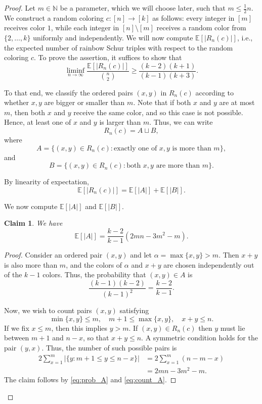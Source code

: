 \documentclass[11pt]{article}
\theoremstyle{plain}
\newtheorem{claim}{Claim}[section]
\numberwithin{equation}{section}
\begin{document}
\begin{proof} Let $m\in \mathbb{N}$ be a parameter, which we will choose later, such that $m\le \frac{1}{2}n$. We construct a random coloring $c:[n]\to [k]$ as follows: every integer in $[m]$ receives color $1$, while each integer in $[n]\setminus [m]$ receives a random color from $\{2, \ldots, k\}$ uniformly and independently. We will now compute $\mathbb{E}[|R_n(c)|] $, i.e., the expected number of rainbow Schur triples with respect to the random coloring $c$. To prove the assertion, it suffices to show that 
\[ \liminf_{n\to \infty} \frac{\mathbb{E}[|R_n(c)|]}{{n\choose 2}}\ge \frac{(k-2)(k+1)}{(k-1)(k+3)}. \]

To that end, we classify the ordered pairs $(x,y)$ in $R_n(c)$ according to whether $x,y$ are bigger or smaller than $m$. Note that if both $x$ and $y$ are at most $m$, then both $x$ and $y$ receive the same color, and so this case is not possible. Hence, at least one of $x$ and $y$ is larger than $m$. Thus, we can write 
\[ R_n(c) = A \sqcup B,\]
where 
\[A = \{(x,y)\in R_n(c): \text{exactly one of }x,y\text{ is more than }m\},\]
and 
\[ B = \{(x,y)\in R_n(c): \text{both }x,y\text{ are more than }m\}.\]

By linearity of expectation,
\begin{equation}\label{eq:exp_R_n_c}
   \mathbb{E}[|R_n(c)|] = \mathbb{E}[|A|] + \mathbb{E}[|B|]. 
\end{equation}

We now compute $\mathbb{E}[|A|]$ and $\mathbb{E}[|B|]$. 

\begin{claim}\label{claim:A} We have
\[ \mathbb{E}[|A|] = \frac{k-2}{k-1}\left(2mn - 3m^2 - m\right).\]
\end{claim}

\begin{proof} Consider an ordered pair $(x,y)$ and let $\alpha = \max\{x,y\}>m$. Then $x+y$ is also more than $m$, and the colors of $\alpha$ and $x+y$ are chosen independently out of the $k-1$ colors. Thus, the probability that $(x,y) \in A$ is 
\begin{equation}\label{eq:prob_A}
    \frac{(k-1)(k-2)}{(k-1)^2}=\frac{k-2}{k-1}.
\end{equation}

Now, we wish to count pairs $(x,y)$ satisfying
\[ \min\{x,y\}\le m, \quad  m+1\le \max\{x,y\}, \quad x+y\le n.\]
If we fix $x\leq m$, then this implies $y> m$. If $(x,y) \in R_{n}(c)$ then $y$ must lie between $m+1$ and $n-x$, so that $x+y\leq n$. A symmetric condition holds for the pair $(y,x)$. Thus, the number of such possible pairs is 
\begin{align}\label{eq:count_A}
2\sum_{x=1}^m |\{y: m+1\le y\le n-x\}| 
& = 2\sum_{x=1}^m (n-m-x)\nonumber\\
& = 2mn - 3m^2 - m.
\end{align}
The claim follows by \eqref{eq:prob_A} and \eqref{eq:count_A}.
\end{proof}


\end{proof}
\end{document}

